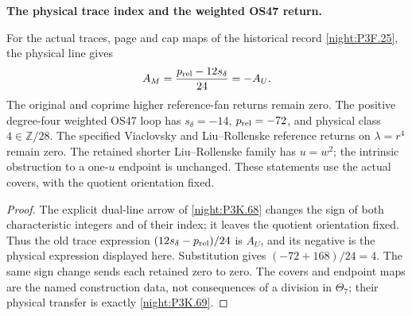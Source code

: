 \begin{proposition}\label{iv:correction:P3F.25}
\textbf{The physical trace index and the weighted OS47 return.}\par
For the actual traces, page and cap maps of the historical record
\cref{night:P3F.25}, the physical line gives
\[
 A_M=\frac{p_{\rm rel}-12s_\delta}{24}=-A_U.
\]
The original and coprime higher reference-fan returns remain zero.
The positive degree-four weighted OS47 loop has
\(s_\delta=-14\), \(p_{\rm rel}=-72\), and physical class \(4\in\mathbb Z/28\).
The specified Viaclovsky and Liu--Rollenske reference returns on
\(\lambda=r^4\) remain zero.  The retained shorter Liu--Rollenske family
has \(u=w^2\); the intrinsic obstruction to a one-\(u\) endpoint is
unchanged. These statements use the actual covers, with the quotient
orientation fixed.
\end{proposition}
\begin{proof}
The explicit dual-line arrow of \cref{night:P3K.68} changes
the sign of both characteristic integers and of their index; it leaves
the quotient orientation fixed. Thus the old trace expression
\((12s_\delta-p_{\rm rel})/24\) is \(A_U\), and its negative is the
physical expression displayed here. Substitution gives
\((-72+168)/24=4\). The same sign change sends each retained zero to
zero. The covers and endpoint maps are the named construction data,
not consequences of a division in \(\Theta_7\); their physical transfer
is exactly \cref{night:P3K.69}.
\end{proof}


